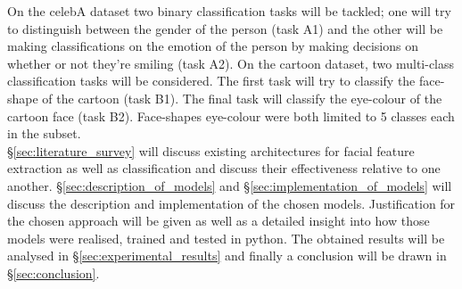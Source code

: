 \documentclass{article}
\begin{document}
    On the celebA dataset two binary classification tasks will be tackled; one will try to distinguish between the gender of the person (task A1) and the other will be making classifications on the emotion of the person by making decisions on whether or not they're smiling (task A2). On the cartoon dataset, two multi-class classification tasks will be considered. The first task will try to classify the face-shape of the cartoon (task B1). The final task will classify the eye-colour of the cartoon face (task B2). Face-shapes eye-colour were both limited to 5 classes each in the subset. 
    \\
    
    \S \ref{sec:literature_survey} will discuss existing architectures for facial feature extraction as well as classification and discuss their effectiveness relative to one another. \S \ref{sec:description_of_models} and \S \ref{sec:implementation_of_models} will discuss the description and implementation of the chosen models. Justification for the chosen approach will be given as well as a detailed insight into how those models were realised, trained and tested in python. The obtained results will be analysed in \S \ref{sec:experimental_results} and finally a conclusion will be drawn in \S \ref{sec:conclusion}.
\end{document}
